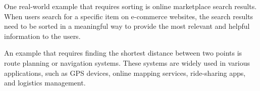 One real-world example that requires sorting is online marketplace search results.
When users search for a specific item on e-commerce websites, the search results need to be sorted in a meaningful way to provide the most relevant and helpful information to the users.

An example that requires finding the shortest distance between two points is route planning or navigation systems.
These systems are widely used in various applications, such as GPS devices, online mapping services, ride-sharing apps, and logistics management.
